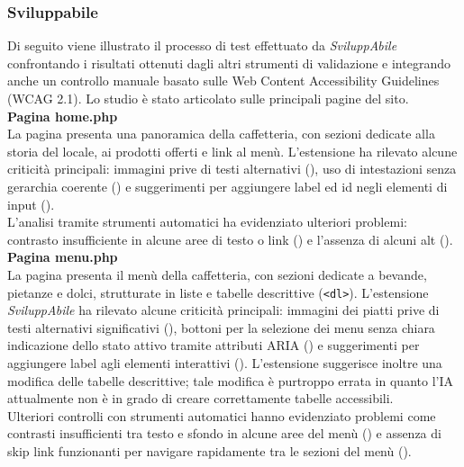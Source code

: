 \subsubsection{Sviluppabile}
\noindent Di seguito viene illustrato il processo di test effettuato da \textit{SviluppAbile} confrontando i risultati ottenuti dagli altri strumenti di validazione e integrando anche un controllo manuale basato sulle Web Content Accessibility Guidelines (WCAG 2.1). Lo studio è stato articolato sulle principali pagine del sito.\\

\noindent \textbf{Pagina home.php}\\
La pagina presenta una panoramica della caffetteria, con sezioni dedicate alla storia del locale, ai prodotti offerti e link al menù. L’estensione ha rilevato alcune criticità principali: immagini prive di testi alternativi ({}), uso di intestazioni senza gerarchia coerente ({}) e suggerimenti per aggiungere label ed id negli elementi di input ({}).\\
L’analisi tramite strumenti automatici ha evidenziato ulteriori problemi: contrasto insufficiente in alcune aree di testo o link ({}) e l'assenza di alcuni alt ({}).\\

\noindent \textbf{Pagina menu.php}\\
La pagina presenta il menù della caffetteria, con sezioni dedicate a bevande, pietanze e dolci, strutturate in liste e tabelle descrittive (\texttt{<dl>}). 
L’estensione \textit{SviluppAbile} ha rilevato alcune criticità principali: immagini dei piatti prive di testi alternativi significativi ({}), bottoni per la selezione dei menu senza chiara indicazione dello stato attivo tramite attributi ARIA ({}) e suggerimenti per aggiungere label agli elementi interattivi ({}). L'estensione suggerisce inoltre una modifica delle tabelle descrittive; tale modifica è purtroppo errata in quanto l'IA attualmente non è in grado di creare correttamente tabelle accessibili.\\
Ulteriori controlli con strumenti automatici hanno evidenziato problemi come contrasti insufficienti tra testo e sfondo in alcune aree del menù ({}) e assenza di skip link funzionanti per navigare rapidamente tra le sezioni del menù ({}).\\

